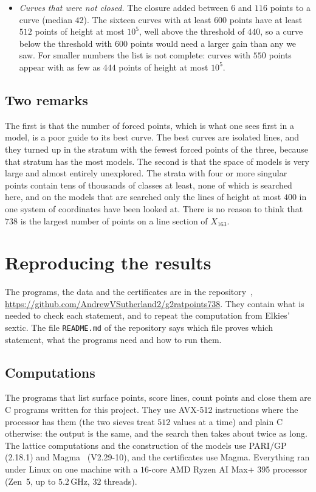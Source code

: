 \documentclass[11pt]{article}
\newcommand{\X}{X}
\theoremstyle{remark}
\begin{document}
\begin{itemize}
twenty of the curves that these lower settings would find; nothing in the sample suggests that it loses curves with $600$ points,
but a sample of this size cannot exclude it.
\item \emph{Curves that were not closed.}  The closure added between $6$ and $116$ points to a curve (median $42$).  The sixteen
curves with at least $600$ points have at least $512$ points of height at most $10^5$, well above the threshold of $440$, so a
curve below the threshold with $600$ points would need a larger gain than any we saw.  For smaller numbers the list is not
complete: curves with $550$ points appear with as few as $444$ points of height at most $10^5$.
\end{itemize}

\subsection*{Two remarks}
The first is that the number of forced points, which is what one sees first in a model, is a poor guide to its best curve.  The best
curves are isolated lines, and they turned up in the stratum with the fewest forced points of the three, because that stratum has
the most models.  The second is that the space of models is very large and almost entirely unexplored.  The strata with four or
more singular points contain tens of thousands of classes at least, none of which is searched here, and on the models that are
searched only the lines of height at most $400$ in one system of coordinates have been looked at.  There is no reason to think
that $738$ is the largest number of points on a line section of $\X_{163}$.

\section{Reproducing the results}\label{sec:files}

The programs, the data and the certificates are in the repository~\cite{Repo},
\url{https://github.com/AndrewVSutherland2/g2ratpoints738}.  They contain what is needed to check each statement, and to repeat
the computation from Elkies' sextic.  The file \texttt{README.md} of the repository says which file proves which statement,
what the programs need and how to run them.

\subsection*{Computations}
The programs that list surface points, score lines, count points and close them are C programs written for this project.  They use
AVX-512 instructions where the processor has them (the two sieves treat $512$ values at a time) and plain C otherwise: the output
is the same, and the search then takes about twice as long.  The lattice computations and the construction of the models use
PARI/GP~\cite{PARI} (2.18.1) and Magma~\cite{Magma} (V2.29-10), and the certificates use Magma.  Everything ran under Linux on one
machine with a $16$-core AMD Ryzen AI Max+ 395 processor (Zen~5, up to $5.2$\,GHz, $32$ threads).
\end{document}

